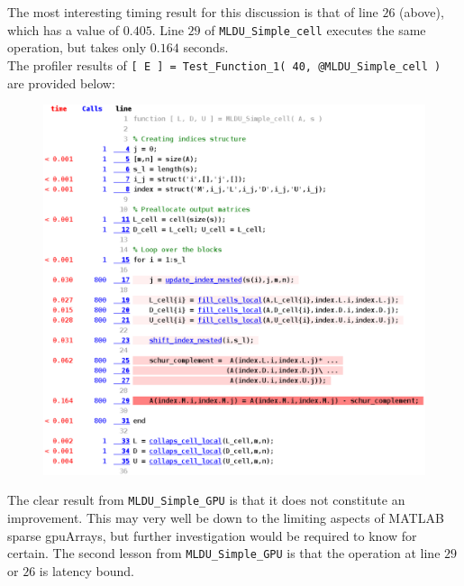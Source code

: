 \newpage

\noindent The most interesting timing result for this discussion is that of line $26$ (above), which has a value of $0.405$. Line $29$ of \texttt{MLDU\_Simple\_cell} executes the same operation, but takes only $0.164$ seconds.\\

\noindent The profiler results of \texttt{[ E ] = Test\_Function\_1( 40, @MLDU\_Simple\_cell )} are provided below:

\begin{figure}[h!]
    \includegraphics[width=\linewidth]{figures/Profile_MLDU_Simple_GPU_2.eps}
    \centering
\end{figure}

\noindent The clear result from \texttt{MLDU\_Simple\_GPU} is that it does not constitute an improvement. This may very well be down to the limiting aspects of MATLAB sparse gpuArrays, but further investigation would be required to know for certain. The second lesson from \texttt{MLDU\_Simple\_GPU} is that the operation at line $29$ or $26$ is latency bound.